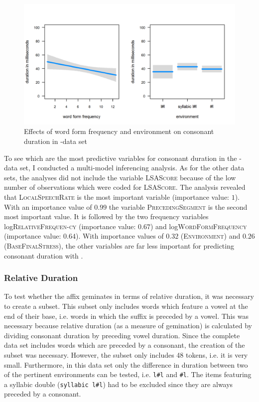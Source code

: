\begin{figure} [t!]
	\centering

	\includegraphics[scale=.8] {images/Corpus/lyModelTransitionTypeAndFreq.png}
	\caption{Effects of word form frequency  and environment on consonant duration in -data set}
	\label{fig:corpus main effects  ly}
\end{figure}




To see which are the most predictive variables for consonant duration in the -data set, I conducted a multi-model inferencing analysis. As for the other data sets, the analyses did not include the variable \textsc{LSAScore} because of the low number of observations which were coded for \textsc{LSAScore}. The analysis revealed that \textsc{LocalSpeechRate} is the most important variable (importance value: $1$). With an importance value of $0.99$ the variable \textsc{PrecedingSegment} is the second most important value. It is followed by the two frequency variables log\textsc{RelativeFrequen-cy} (importance value: $0.67$) and log\textsc{WordFormFrequency} (importance value: $0.64$). With importance values of $0.32$ (\textsc{Environment}) and $0.26$ (\textsc{BaseFinalStress}), the other variables are far less important for predicting consonant duration with .


\subsubsection{Relative Duration}

To test whether the affix  geminates in terms of relative duration, it was necessary to create a subset. This subset only includes words which feature a vowel at the end of their base, i.e. words in which the suffix is preceded by a vowel. This was necessary because relative duration (as a measure of gemination) is calculated by dividing consonant duration by preceding vowel duration. Since the complete data set includes words which are preceded by a consonant, the creation of the subset was necessary.
However, the subset only includes 48 tokens, i.e. it is very small. Furthermore, in this data set only the difference in duration between two of the pertinent environments can be tested, i.e. \texttt{l\#l} and \texttt{\#l}. The items featuring a syllabic double (\texttt{syllabic l\#l}) had to be excluded since they are always preceded by a consonant. 

